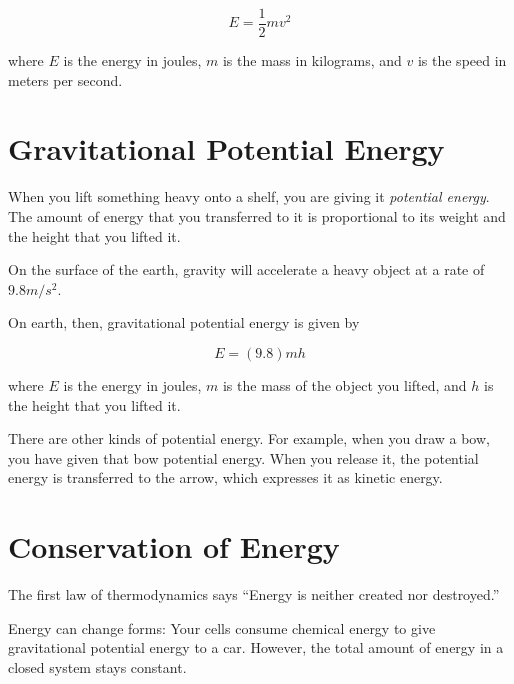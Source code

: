 \begin{mdframed}[style=important, frametitle={Formula for Kinetic Energy}]

$$E = \frac{1}{2} m v^2$$

where $E$ is the energy in joules, $m$ is the mass in kilograms, and
$v$ is the speed in meters per second.

\end{mdframed}

\section{Gravitational Potential Energy}

When you lift something heavy onto a shelf, you are giving it
\textit{potential energy}. The amount of energy that you transferred
to it is proportional to its weight and the height that you lifted it.

On the surface of the earth, gravity will accelerate a heavy object at
a rate of $9.8 m/s^2$.

\begin{mdframed}[style=important, frametitle={Formula for Gravitational Potential Energy}]
On earth, then, gravitational potential energy is given by

$$E = (9.8)mh$$


where $E$ is the energy in joules, $m$ is the mass of the object you
lifted, and $h$ is the height that you lifted it.

\end{mdframed}


There are other kinds of potential energy. For example, when you draw
a bow, you have given that bow potential energy. When you release it,
the potential energy is transferred to the arrow, which expresses it
as kinetic energy.

\section{Conservation of Energy}

The first law of thermodynamics says ``Energy is neither created nor
destroyed.''

Energy can change forms: Your cells consume chemical energy to give
gravitational potential energy to a car.  However, the total amount of
energy in a closed system stays constant.

